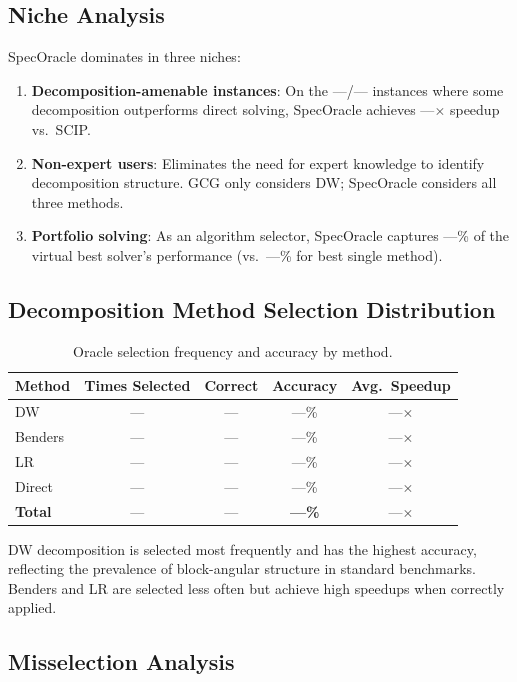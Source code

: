 \documentclass[11pt]{article}
\begin{document}
\subsection{Niche Analysis}

SpecOracle dominates in three niches:
\begin{enumerate}
\item \textbf{Decomposition-amenable instances}: On the ---/--- instances where some decomposition outperforms direct solving, SpecOracle achieves ---$\times$ speedup vs.\ SCIP.
\item \textbf{Non-expert users}: Eliminates the need for expert knowledge to identify decomposition structure. GCG only considers DW; SpecOracle considers all three methods.
\item \textbf{Portfolio solving}: As an algorithm selector, SpecOracle captures ---\% of the virtual best solver's performance (vs.\ ---\% for best single method).
\end{enumerate}

\subsection{Decomposition Method Selection Distribution}

\begin{table}[t]
\centering
\caption{Oracle selection frequency and accuracy by method.}
\begin{tabular}{lcccc}
\toprule
\textbf{Method} & \textbf{Times Selected} & \textbf{Correct} & \textbf{Accuracy} & \textbf{Avg.\ Speedup} \\
\midrule
DW & --- & --- & ---\% & ---$\times$ \\
Benders & --- & --- & ---\% & ---$\times$ \\
LR & --- & --- & ---\% & ---$\times$ \\
Direct & --- & --- & ---\% & ---$\times$ \\
\midrule
\textbf{Total} & --- & --- & \textbf{---\%} & ---$\times$ \\
\bottomrule
\end{tabular}
\end{table}

DW decomposition is selected most frequently and has the highest accuracy, reflecting the prevalence of block-angular structure in standard benchmarks. Benders and LR are selected less often but achieve high speedups when correctly applied.

\subsection{Misselection Analysis}
\end{document}
